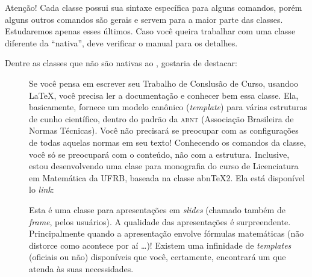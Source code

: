 \begin{atencao}{Atenção!}{\exclamacao}
  Cada classe possui sua sintaxe específica para alguns comandos, porém alguns 
  outros comandos são gerais e servem para a maior parte das classes. 
  Estudaremos apenas esses últimos.
  Caso você queira trabalhar com uma classe diferente da “nativa”, deve 
  verificar o manual para os detalhes.
\end{atencao}

Dentre as classes que não são nativas ao , gostaria de destacar:

\begin{description}
  \item[] Se você pensa em escrever seu Trabalho de Conslusão 
                   de Curso, usandoo \LaTeX, você precisa ler a documentação e 
                   conhecer bem essa classe.
                   Ela, basicamente, fornece um modelo canônico (\textit{template})
                   para várias estruturas de cunho científico, dentro do padrão 
                   da \textsc{abnt} (Associação Brasileira de Normas Técnicas).
                   Você não precisará se preocupar com as configurações de todas
                   aquelas normas em seu texto!
                   Conhecendo os comandos da classe, você só se preocupará com 
                   o \textsf{conteúdo}, não com a \textsf{estrutura}.
                   Inclusive, estou desenvolvendo uma clase para monografia do 
                   curso de Licenciatura em Matemática da UFRB, baseada na classe
                   abn\TeX 2.
                   Ela está disponível lo \textit{link}: 
  \item[] Esta é uma classe para apresentações em \textit{slides} 
                   (chamado também de \textit{frame}, pelos usuários).
                   A qualidade das apresentações é surpreendente. 
                   Principalmente quando a apresentação envolve fórmulas 
                   matemáticas (não distorce como acontece por aí \ldots)!
                   Existem uma infinidade de \textit{templates} (oficiais ou não) 
                   disponíveis que você, certamente, encontrará um que atenda às 
                   suas necessidades.

\end{description}
